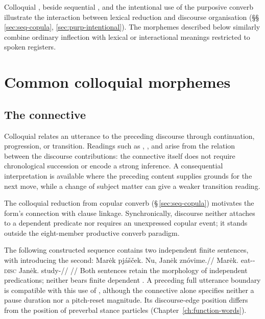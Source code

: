 Colloquial , beside sequential , and the intentional use
of the purposive converb illustrate the interaction between lexical reduction
and discourse organisation (§§\,\ref{sec:seq-copula},
\ref{sec:purp-intentional}). The morphemes described below similarly combine
ordinary inflection with lexical or interactional meanings restricted to spoken
registers.

\section{Common colloquial morphemes}\label{sec:spoken-morphemes}

\subsection{The connective }\label{sec:spoken-nu}

Colloquial  relates an utterance to the preceding discourse through
continuation, progression, or transition. Readings such as ,
, and  arise from the relation between the discourse
contributions: the connective itself does not require chronological succession
or encode a strong inference. A consequential interpretation is available
where the preceding content supplies grounds for the next move, while a change
of subject matter can give a weaker transition reading.

The colloquial reduction from copular converb 
(§\,\ref{sec:seq-copula}) motivates the form's connection with clause
linkage. Synchronically, discourse  neither attaches to a dependent
predicate nor requires an unexpressed copular event; it stands outside the
eight-member productive converb paradigm.

The following constructed sequence contains two independent finite
sentences, with  introducing the second:
\ex\label{ex:nu-independent-continuation}%
\begingl
\gla Marėk pjášček. Nu, Janėk znóvime.//
\glb Marėk.\Dir{} eat-\Antip{}-\Pf{} \textsc{disc} Janėk.\Dir{} study-\Prog{}//
\glft {}
//
\endgl
\xe
Both sentences retain the morphology of independent predications; neither
bears finite dependent . A preceding full utterance boundary is
compatible with this use of , although the connective alone specifies
neither a pause duration nor a pitch-reset magnitude. Its discourse-edge
position differs from the position of preverbal stance particles
(Chapter~\ref{ch:function-words}).


